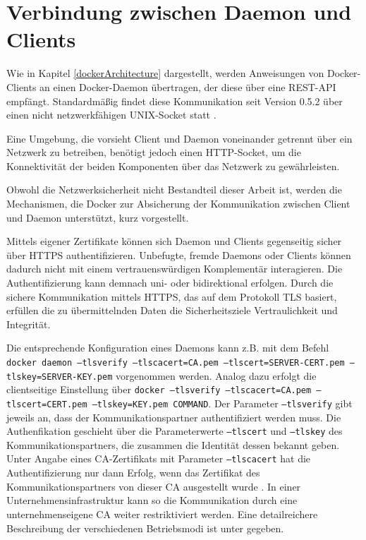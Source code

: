 \documentclass[../main.tex]{subfiles}
\begin{document}


  \section{Verbindung zwischen Daemon und Clients}
  \label{conClientServer}
    Wie in Kapitel \ref{dockerArchitecture} dargestellt, werden Anweisungen von Docker-Clients an einen Docker-Daemon übertragen, der diese über eine REST-API empfängt. Standardmäßig findet diese Kommunikation seit Version 0.5.2 über einen nicht netzwerkfähigen UNIX-Socket statt \cite{dockerSecurity}.

    Eine Umgebung, die vorsieht Client und Daemon voneinander getrennt über ein Netzwerk zu betreiben, benötigt jedoch einen HTTP-Socket, um die Konnektivität der beiden Komponenten über das Netzwerk zu gewährleisten.

    Obwohl die Netzwerksicherheit nicht Bestandteil dieser Arbeit ist, werden die Mechanismen, die Docker zur Absicherung der Kommunikation zwischen Client und Daemon unterstützt, kurz vorgestellt.

    Mittels eigener Zertifikate können sich Daemon und Clients gegenseitig sicher über HTTPS authentifizieren. Unbefugte, fremde Daemons oder Clients können dadurch nicht mit einem vertrauenswürdigen Komplementär interagieren. Die Authentifizierung kann demnach uni- oder bidirektional erfolgen. Durch die sichere Kommunikation mittels HTTPS, das auf dem Protokoll TLS basiert, erfüllen die zu übermittelnden Daten die Sicherheitsziele Vertraulichkeit und Integrität.

    Die entsprechende Konfiguration eines Daemons kann z.B. mit dem Befehl \texttt{docker daemon --tlsverify --tlscacert=CA.pem --tlscert=SERVER-CERT.pem --tlskey=SERVER-KEY.pem} vorgenommen werden. Analog dazu erfolgt die clientseitige Einstellung über \texttt{docker --tlsverify --tlscacert=CA.pem --tlscert=CERT.pem --tlskey=KEY.pem COMMAND}. Der Parameter \texttt{--tlsverify} gibt jeweils an, dass der Kommunikationspartner authentifiziert werden muss. Die Authenfikation geschieht über die Parameterwerte \texttt{--tlscert} und \texttt{--tlskey} des Kommunikationspartners, die zusammen die Identität dessen bekannt geben. Unter Angabe eines CA-Zertifikats mit Parameter \texttt{--tlscacert} hat die Authentifizierung nur dann Erfolg, wenn das Zertifikat des Kommunikationspartners von dieser CA ausgestellt wurde \cite{dockerSecurityHTTPS}. In einer Unternehmensinfrastruktur kann so die Kommunikation durch eine unternehmenseigene CA weiter restriktiviert werden. Eine detailreichere Beschreibung der verschiedenen Betriebsmodi ist unter \cite{dockerSecurityHTTPS} gegeben.
\end{document}
